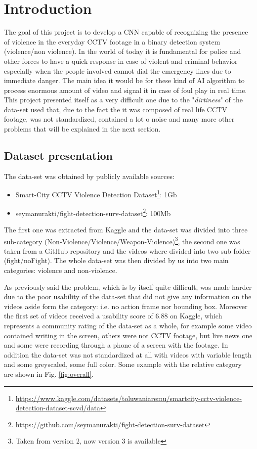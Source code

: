 \chapter{Introduction}
The goal of this project is to develop a CNN capable of recognizing the presence of violence in the everyday CCTV footage in a binary detection system (violence/non violence). In the world of today it is fundamental for police and other forces to have a quick response in case of violent and criminal behavior especially when the people involved cannot dial the emergency lines due to immediate danger. The main idea it would be for these kind of AI algorithm to process enormous amount of video and signal it in case of foul play in real time. This project presented itself as a very difficult one due to the "\textit{dirtiness}" of the data-set used that, due to the fact the it was composed of real life CCTV footage, was not standardized, contained a lot o noise and many more other problems that will be explained in the next section.

\section{Dataset presentation}
The data-set was obtained by publicly available sources:
\begin{itemize}
	\item Smart-City CCTV Violence Detection Dataset\footnote{\url{https://www.kaggle.com/datasets/toluwaniaremu/smartcity-cctv-violence-detection-dataset-scvd/data}}: 1Gb
	\item seymanurakti/fight-detection-surv-dataset\footnote{\url{https://github.com/seymanurakti/fight-detection-surv-dataset}}: 100Mb
\end{itemize}

The first one was extracted from Kaggle and the data-set was divided into three sub-category (Non-Violence/Violence/Weapon-Violence)\footnote{Taken from version 2, now version 3 is available}, the second one was taken from a GitHub repository and the videos where divided into two sub folder (fight/noFight). The whole data-set was then divided by us into two main categories: violence and non-violence.

As previously said the problem, which is by itself quite difficult, was made harder due to the poor usability of the data-set that did not give any information on the videos aside form the category: i.e. no action frame nor bounding box. Moreover the first set of videos received a usability score of 6.88 on Kaggle, which represents a community rating of the data-set as a whole, for example some video contained writing in the screen, others were not CCTV footage, but live news one and some were recording through a phone of a screen with the footage. In addition the data-set was not standardized at all with videos with variable length and some greyscaled, some full color. Some example with the relative category are shown in Fig. \ref*{fig:overall}.

